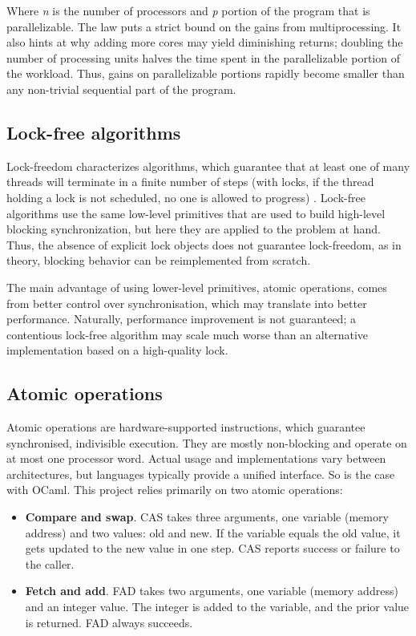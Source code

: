 \documentclass[12pt,a4paper,twoside]{report}
\begin{document}
Where \textit{n} is the number of processors and \textit{p} portion of the program that is parallelizable. The law puts a strict bound on the gains from multiprocessing. It also hints at why adding more cores may yield diminishing returns; doubling the number of processing units halves the time spent in the parallelizable portion of the workload. Thus, gains on parallelizable portions rapidly become smaller than any non-trivial sequential part of the program. 

\subsection{Lock-free algorithms}
Lock-freedom characterizes algorithms, which guarantee that at least one of many threads will terminate in a finite number of steps (with locks, if the thread holding a lock is not scheduled, no one is allowed to progress) \cite{art_of_mult}. Lock-free algorithms use the same low-level primitives that are used to build high-level blocking synchronization, but here they are applied to the problem at hand. Thus, the absence of explicit lock objects does not guarantee lock-freedom, as in theory, blocking behavior can be reimplemented from scratch. 

The main advantage of using lower-level primitives, atomic operations, comes from better control over synchronisation, which may translate into better performance. Naturally, performance improvement is not guaranteed; a contentious lock-free algorithm may scale much worse than an alternative implementation based on a high-quality lock.

\subsection{Atomic operations}
Atomic operations are hardware-supported instructions, which guarantee synchronised, indivisible execution. They are mostly non-blocking and operate on at most one processor word. Actual usage and implementations vary between architectures, but languages typically provide a unified interface. So is the case with OCaml. This project relies primarily on two atomic operations:
\begin{itemize}
    \item \textbf{Compare and swap}. CAS takes three arguments, one variable (memory address) and two values: old and new. If the variable equals the old value, it gets updated to the new value in one step. CAS reports success or failure to the caller.  
    \item \textbf{Fetch and add}. FAD takes two arguments, one variable (memory address) and an integer value. The integer is added to the variable, and the prior value is returned. FAD always succeeds.  
\end{itemize}
\end{document}
